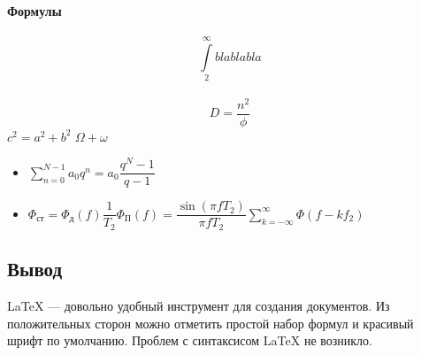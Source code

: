\documentclass[10pt,a4paper]{article}
\begin{document}
\paragraph{Формулы}
$$\int\limits_2^{\infty} blablabla$$
\\
$$D = \frac{n^2}{\phi}$$
\hspace{10cm} $c^2=a^2+b^2$
$\Omega + 
\omega$
\begin{itemize}
\item $\sum\limits_{n=0}^{N-1} a_0 q^n = a_0 \dfrac{q^N-1}{q-1}$

\item $\Phi_\text{ст} = \Phi_\text{д}(f) \dfrac{1}{T_2} \Phi_\text{П}(f) = \dfrac{\sin(\pi f T_2)}{\pi f T_2} \sum\limits_{k=-\infty}^{\infty} \Phi (f - k f_2)$
\end{itemize}
\subsection{Вывод}
\LaTeX{} --- довольно удобный инструмент для создания документов. Из положительных сторон можно отметить простой набор формул и красивый шрифт по умолчанию. Проблем с синтаксисом \LaTeX{} не возникло.
\end{document}
